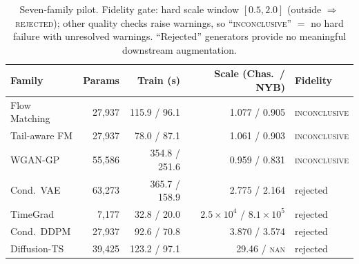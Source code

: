 \begin{table}[htbp]
\centering
\caption{Seven-family pilot. Fidelity gate: hard scale window $[0.5,2.0]$
(outside $\Rightarrow$ \textsc{rejected}); other quality checks raise warnings,
so ``\textsc{inconclusive}'' $=$ no hard failure with unresolved warnings.
``Rejected'' generators
provide no meaningful downstream augmentation.}
\begin{tabular}{l r r r l}
\toprule
Family & Params & Train (s) & Scale (Chas.\ / NYB) & Fidelity \\
\midrule
Flow Matching   & 27{,}937 & 115.9 / 96.1  & 1.077 / 0.905 & \textsc{inconclusive} \\
Tail-aware FM   & 27{,}937 & 78.0 / 87.1   & 1.061 / 0.903 & \textsc{inconclusive} \\
WGAN-GP        & 55{,}586 & 354.8 / 251.6 & 0.959 / 0.831 & \textsc{inconclusive} \\
Cond.\ VAE     & 63{,}273 & 365.7 / 158.9 & 2.775 / 2.164 & rejected \\
TimeGrad       & 7{,}177  & 32.8 / 20.0   & $2.5{\times}10^{4}$ / $8.1{\times}10^{5}$ & rejected \\
Cond.\ DDPM    & 27{,}937 & 92.6 / 70.8   & 3.870 / 3.574 & rejected \\
Diffusion-TS   & 39{,}425 & 123.2 / 97.1  & 29.46 / \textsc{nan} & rejected \\
\bottomrule
\end{tabular}
\label{tab:benchmark-pilot}
\end{table}

